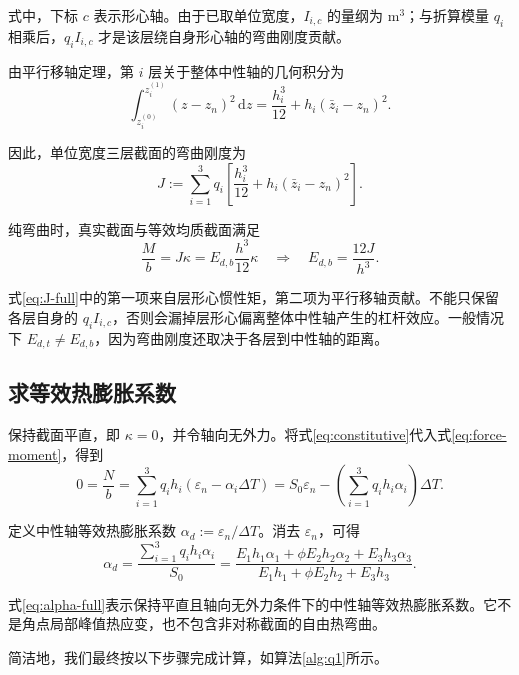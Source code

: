 \documentclass[draft,12pt,a4paper]{ctexart}
\theoremstyle{definition}
\newcommand{\diff}{\mathrm{d}}
\begin{document}
式中，下标 $c$ 表示形心轴。由于已取单位宽度，$I_{i,c}$ 的量纲为 $\mathrm{m}^3$；与折算模量 $q_i$ 相乘后，$q_iI_{i,c}$ 才是该层绕自身形心轴的弯曲刚度贡献。

由平行移轴定理，第 $i$ 层关于整体中性轴的几何积分为
\begin{equation}
\int_{z_i^{(0)}}^{z_i^{(1)}}(z-z_n)^2\,\diff z
=\frac{h_i^3}{12}+h_i(\bar z_i-z_n)^2.
\end{equation}

因此，单位宽度三层截面的弯曲刚度为
\begin{equation}\label{eq:J-full}
J:=\sum_{i=1}^{3}q_i
\left[\frac{h_i^3}{12}+h_i(\bar z_i-z_n)^2\right].
\end{equation}

纯弯曲时，真实截面与等效均质截面满足
\begin{equation}
\frac Mb=J\kappa
=E_{d,b}\frac{h^3}{12}\kappa
\quad\Rightarrow\quad
\boxed{E_{d,b}=\frac{12J}{h^3}}.
\end{equation}

式\eqref{eq:J-full}中的第一项来自层形心惯性矩，第二项为平行移轴贡献。不能只保留各层自身的 $q_iI_{i,c}$，否则会漏掉层形心偏离整体中性轴产生的杠杆效应。一般情况下 $E_{d,t}\ne E_{d,b}$，因为弯曲刚度还取决于各层到中性轴的距离。

\subsection{求等效热膨胀系数}

保持截面平直，即 $\kappa=0$，并令轴向无外力。将式\eqref{eq:constitutive}代入式\eqref{eq:force-moment}，得到
\begin{equation}
0=\frac Nb
=\sum_{i=1}^{3}q_ih_i(\varepsilon_n-\alpha_i\Delta T)
=S_0\varepsilon_n-\left(\sum_{i=1}^{3}q_ih_i\alpha_i\right)\Delta T.
\end{equation}

定义中性轴等效热膨胀系数 $\alpha_d:=\varepsilon_n/\Delta T$。消去 $\varepsilon_n$，可得
\begin{equation}\label{eq:alpha-full}
\boxed{
\alpha_d
=\frac{\sum_{i=1}^{3}q_ih_i\alpha_i}{S_0}
=\frac{E_1h_1\alpha_1+\phi E_2h_2\alpha_2+E_3h_3\alpha_3}
{E_1h_1+\phi E_2h_2+E_3h_3}
}.
\end{equation}

式\eqref{eq:alpha-full}表示保持平直且轴向无外力条件下的中性轴等效热膨胀系数。它不是角点局部峰值热应变，也不包含非对称截面的自由热弯曲。

简洁地，我们最终按以下步骤完成计算，如算法\ref{alg:q1}所示。
\end{document}

